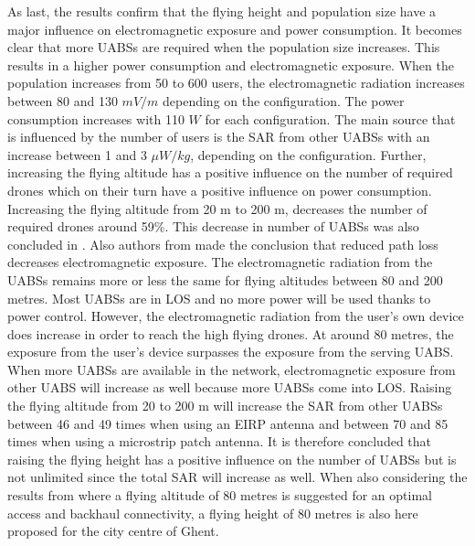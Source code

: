 As last, the results confirm that the flying height and population size have a major influence on electromagnetic exposure and 
power consumption. It becomes clear that more \gls{UABS}s are required when the population size increases. 
This results in a higher power 
consumption and electromagnetic exposure. When the population increases from 50 to 600 users, 
the electromagnetic radiation increases between 80 and 130 $mV/m$ depending
on the configuration. The power consumption increases with 110 $W$ for each configuration. 
The main source that is influenced by the number of users is the \gls{SAR} from other \gls{UABS}s with an increase between 1 and 3 $\mu W/kg$, depending on 
the configuration.
Further, increasing the flying altitude has a positive influence on the number of required drones which on their 
turn have a positive influence on power consumption. Increasing the flying altitude from 20 m to 200 m, decreases the number 
of required drones around 59\%. This decrease in number of \gls{UABS}s was also concluded in \cite{J2}.
Also authors from \cite{J17_kuehn2019modelling} made the conclusion that reduced path loss decreases electromagnetic exposure.
The electromagnetic radiation from the \gls{UABS}s remains more or less the same for flying altitudes between 80 and 200 metres. Most 
\gls{UABS}s are in \gls{LOS} and no more power will be used thanks to power control.
However, the electromagnetic radiation from the user's own device does increase in order to reach the high flying drones.
At around 80 metres, the exposure from the  user's device surpasses the exposure from the serving \gls{UABS}.
When more \gls{UABS}s are available in the network, electromagnetic exposure from other \gls{UABS} will increase as well 
because more \gls{UABS}s come into \gls{LOS}. Raising the flying altitude from 20 to 200 m will increase the \gls{SAR} from other 
\gls{UABS}s between 46 and 49 times when using an \gls{EIRP} antenna and between 70 and 85 times when using a microstrip patch antenna.
It is therefore concluded that raising the flying height has a positive influence on the number of 
\gls{UABS}s but is not unlimited since the total \gls{SAR} will increase as well.
When also considering the results from \cite{U1} where a flying altitude of  
80 metres is suggested for an optimal access and backhaul connectivity, a flying height 
of 80 metres is also here proposed for the city centre of Ghent.

